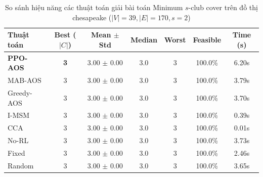 \begin{table}[htbp]
\centering
\caption{So sánh hiệu năng các thuật toán giải bài toán Minimum $s$-club cover trên đồ thị chesapeake ($|V|=39, |E|=170, s=2$)}
\label{tab:results_chesapeake}
\begin{tabular}{lcccccc}
\hline
\textbf{Thuật toán} & \textbf{Best ($|C|$)} & \textbf{Mean $\pm$ Std} & \textbf{Median} & \textbf{Worst} & \textbf{Feasible} & \textbf{Time (s)} \\
\hline
\textbf{PPO-AOS} & \textbf{3} & 3.00 $\pm$ 0.00 & 3.0 & 3 & 100.0\% & 6.20s \\
MAB-AOS & 3 & 3.00 $\pm$ 0.00 & 3.0 & 3 & 100.0\% & 3.79s \\
Greedy-AOS & 3 & 3.00 $\pm$ 0.00 & 3.0 & 3 & 100.0\% & 3.70s \\
I-MSM & 3 & 3.00 $\pm$ 0.00 & 3.0 & 3 & 100.0\% & 0.39s \\
CCA & 3 & 3.00 $\pm$ 0.00 & 3.0 & 3 & 100.0\% & 0.01s \\
No-RL & 3 & 3.00 $\pm$ 0.00 & 3.0 & 3 & 100.0\% & 3.73s \\
Fixed & 3 & 3.00 $\pm$ 0.00 & 3.0 & 3 & 100.0\% & 2.46s \\
Random & 3 & 3.00 $\pm$ 0.00 & 3.0 & 3 & 100.0\% & 3.65s \\
\hline
\end{tabular}
\end{table}

